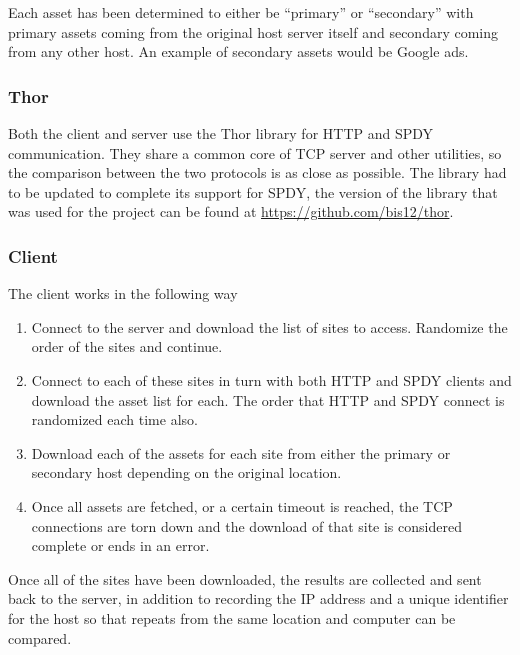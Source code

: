 \documentclass[10pt,letterpaper,notitlepage]{article}
\begin{document}
Each asset has been determined to either be ``primary'' or ``secondary'' with
primary assets coming from the original host server itself and secondary coming
from any other host.  An example of secondary assets would be Google ads.

\subsubsection{Thor}
\label{sec:research/thor}
Both the client and server use the Thor library for HTTP and SPDY communication.
They share a common core of TCP server and other utilities, so the comparison
between the two protocols is as close as possible.  The library had to be
updated to complete its support for SPDY, the version of the library that was
used for the project can be found at \url{https://github.com/bis12/thor}.

\subsubsection{Client}
\label{sec:research/client}
The client works in the following way
\begin{enumerate}
    \item Connect to the server and download the list of sites to access.
        Randomize the order of the sites and continue.
    \item Connect to each of these sites in turn with both HTTP and SPDY clients
        and download the asset list for each.  The order that HTTP and SPDY
        connect is randomized each time also.
    \item Download each of the assets for each site from either the primary or
        secondary host depending on the original location.
    \item Once all assets are fetched, or a certain timeout is reached, the TCP
        connections are torn down and the download of that site is considered
        complete or ends in an error.
\end{enumerate}
Once all of the sites have been downloaded, the results are collected and sent
back to the server, in addition to recording the IP address and a unique
identifier for the host so that repeats from the same location and computer can
be compared.

\end{document}
